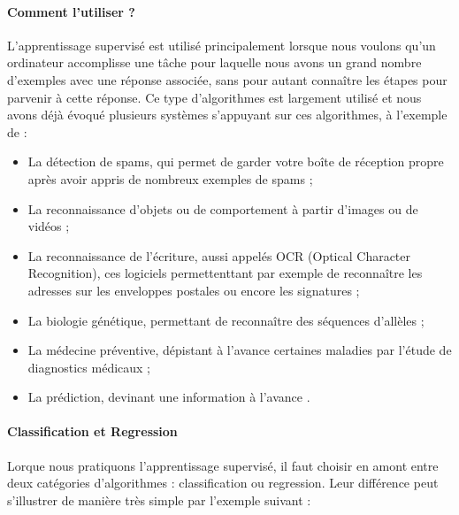 \paragraph{Comment l'utiliser ?} L'apprentissage supervisé est utilisé principalement lorsque nous voulons qu'un ordinateur accomplisse une tâche pour laquelle nous avons un grand nombre
d'exemples avec une réponse associée, sans pour autant connaître les étapes pour parvenir à cette réponse. Ce type d'algorithmes est largement utilisé et nous avons déjà évoqué plusieurs
systèmes s'appuyant sur ces algorithmes, à l'exemple de :
\begin{itemize}
    \item La détection de spams, qui permet de garder votre boîte de réception propre après avoir appris de nombreux exemples de spams ;
    \item La reconnaissance d'objets ou de comportement à partir d'images ou de vidéos ;
    \item La reconnaissance de l'écriture, aussi appelés OCR (Optical Character Recognition), ces logiciels permettenttant par exemple de reconnaître les adresses sur les
    enveloppes postales ou encore les signatures ;
    \item La biologie génétique, permettant de reconnaître des séquences d'allèles ;
    \item La médecine préventive, dépistant à l'avance certaines maladies par l'étude de diagnostics médicaux ;
    \item La prédiction, devinant une information à l'avance \cite{MachineLearning2}.
\end{itemize}

\paragraph{Classification et Regression} Lorque nous pratiquons l'apprentissage supervisé, il faut choisir en amont entre deux catégories d'algorithmes : classification ou
regression. Leur différence peut s'illustrer de manière très simple par l'exemple suivant :


